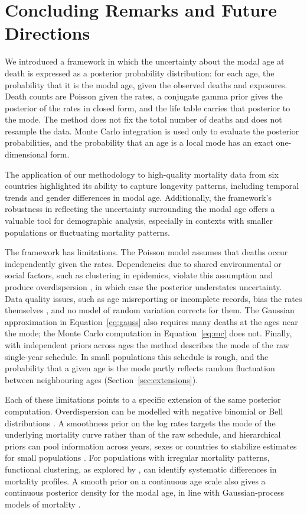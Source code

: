 \documentclass[12pt, letterpaper]{article}
\begin{document}
\section{Concluding Remarks and Future Directions}

We introduced a framework in which the uncertainty about the modal age at death is expressed as a posterior probability distribution: for each age, the probability that it is the modal age, given the observed deaths and exposures. Death counts are Poisson given the rates, a conjugate gamma prior gives the posterior of the rates in closed form, and the life table carries that posterior to the mode. The method does not fix the total number of deaths and does not resample the data. Monte Carlo integration is used only to evaluate the posterior probabilities, and the probability that an age is a local mode has an exact one-dimensional form.

The application of our methodology to high-quality mortality data from six countries highlighted its ability to capture longevity patterns, including temporal trends and gender differences in modal age. Additionally, the framework's robustness in reflecting the uncertainty surrounding the modal age offers a valuable tool for demographic analysis, especially in contexts with smaller populations or fluctuating mortality patterns.

The framework has limitations. The Poisson model assumes that deaths occur independently given the rates. Dependencies due to shared environmental or social factors, such as clustering in epidemics, violate this assumption and produce overdispersion \citep{leger2021can}, in which case the posterior understates uncertainty. Data quality issues, such as age misreporting or incomplete records, bias the rates themselves \citep{preston1999effects}, and no model of random variation corrects for them. The Gaussian approximation in Equation~\eqref{eq:gauss} also requires many deaths at the ages near the mode; the Monte Carlo computation in Equation~\eqref{eq:mc} does not. Finally, with independent priors across ages the method describes the mode of the raw single-year schedule. In small populations this schedule is rough, and the probability that a given age is the mode partly reflects random fluctuation between neighbouring ages (Section~\ref{sec:extensions}).

Each of these limitations points to a specific extension of the same posterior computation. Overdispersion can be modelled with negative binomial or Bell distributions \citep{castellares2018bell}. A smoothness prior on the log rates targets the mode of the underlying mortality curve rather than of the raw schedule, and hierarchical priors can pool information across years, sexes or countries to stabilize estimates for small populations \citep{gelman1995bayesian}. For populations with irregular mortality patterns, functional clustering, as explored by \citet{leger2021can}, can identify systematic differences in mortality profiles. A smooth prior on a continuous age scale also gives a continuous posterior density for the modal age, in line with Gaussian-process models of mortality \citep{ludkovski2018gaussian}.
\end{document}
